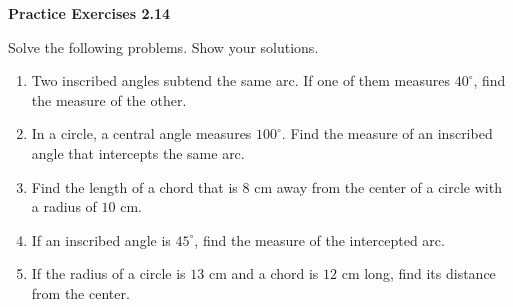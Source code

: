 \vspace{0.3ex}
\noindent\textbf{Practice Exercises 2.14}

\vspace{0.2ex}

Solve the following problems. Show your solutions.

\begin{enumerate}
    \item Two inscribed angles subtend the same arc. If one of them measures $40^\circ$, find the measure of the other.
    \item In a circle, a central angle measures $100^\circ$. Find the measure of an inscribed angle that intercepts the same arc.
    \item Find the length of a chord that is $8$ cm away from the center of a circle with a radius of $10$ cm.
    \item If an inscribed angle is $45^\circ$, find the measure of the intercepted arc.
    \item If the radius of a circle is $13$ cm and a chord is $12$ cm long, find its distance from the center.
\end{enumerate}
